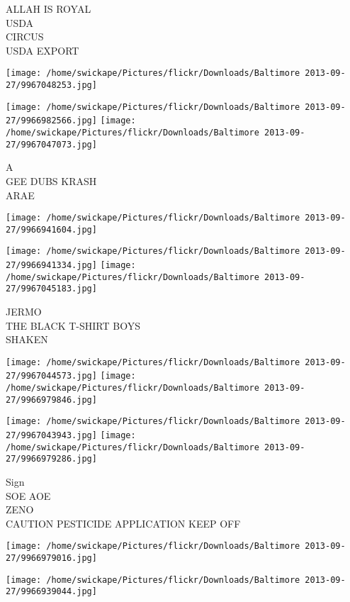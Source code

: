 \documentclass[10pt,letterpaper]{article}
\begin{document}
ALLAH IS ROYAL\\
USDA\\
CIRCUS\\
USDA EXPORT\\
\pagebreak

\texttt{[image: /home/swickape/Pictures/flickr/Downloads/Baltimore 2013-09-27/9967048253.jpg]}

\vspace{0.25in}
\texttt{[image: /home/swickape/Pictures/flickr/Downloads/Baltimore 2013-09-27/9966982566.jpg]}
\texttt{[image: /home/swickape/Pictures/flickr/Downloads/Baltimore 2013-09-27/9967047073.jpg]}

A\\
GEE DUBS KRASH\\
ARAE\\
\pagebreak

\texttt{[image: /home/swickape/Pictures/flickr/Downloads/Baltimore 2013-09-27/9966941604.jpg]}

\vspace{0.25in}
\texttt{[image: /home/swickape/Pictures/flickr/Downloads/Baltimore 2013-09-27/9966941334.jpg]}
\texttt{[image: /home/swickape/Pictures/flickr/Downloads/Baltimore 2013-09-27/9967045183.jpg]}

JERMO\\
THE BLACK T{-}SHIRT BOYS\\
SHAKEN\\
\pagebreak

\texttt{[image: /home/swickape/Pictures/flickr/Downloads/Baltimore 2013-09-27/9967044573.jpg]}
\texttt{[image: /home/swickape/Pictures/flickr/Downloads/Baltimore 2013-09-27/9966979846.jpg]}

\texttt{[image: /home/swickape/Pictures/flickr/Downloads/Baltimore 2013-09-27/9967043943.jpg]}
\texttt{[image: /home/swickape/Pictures/flickr/Downloads/Baltimore 2013-09-27/9966979286.jpg]}

Sign\\
SOE AOE\\
ZENO\\
CAUTION PESTICIDE APPLICATION KEEP OFF\\
\pagebreak

\texttt{[image: /home/swickape/Pictures/flickr/Downloads/Baltimore 2013-09-27/9966979016.jpg]}

\vspace{0.25in}
\texttt{[image: /home/swickape/Pictures/flickr/Downloads/Baltimore 2013-09-27/9966939044.jpg]}
\end{document}
